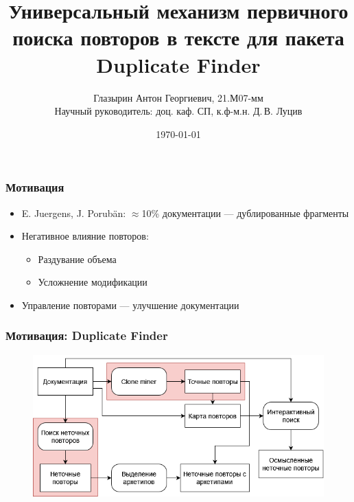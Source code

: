 \documentclass[aspectratio=169]{beamer}
\title[]{Универсальный механизм первичного поиска повторов в тексте для пакета Duplicate Finder}
\author[Глазырин Антон]{Глазырин Антон Георгиевич, 21.М07-мм\\[1ex] 
 {\small Научный руководитель: доц. каф. СП, к.ф-м.н. Д.\,В. Луцив\\}}
\institute[]{СПбГУ}
\date{\SetDate[18/05/2023]\today}
\begin{document}
	

\begin{frame}
\titlepage
\end{frame}


\begin{frame}\frametitle{Мотивация}
\begin{itemize}
	\item E. Juergens, J. Porubän: $\approx$10\% документации --- дублированные фрагменты
	\item Негативное влияние повторов:
	\begin{itemize}
		\item Раздувание объема
		\item Усложнение модификации
	\end{itemize}
	\item Управление повторами --- улучшение документации
\end{itemize}
\end{frame}


\begin{frame}\frametitle{Мотивация: Duplicate Finder}
	\begin{figure}
		\includegraphics[scale=0.45]{../diploma/pictures/DuplicateFinder.png}
	\end{figure}
\end{frame}

\end{document}
